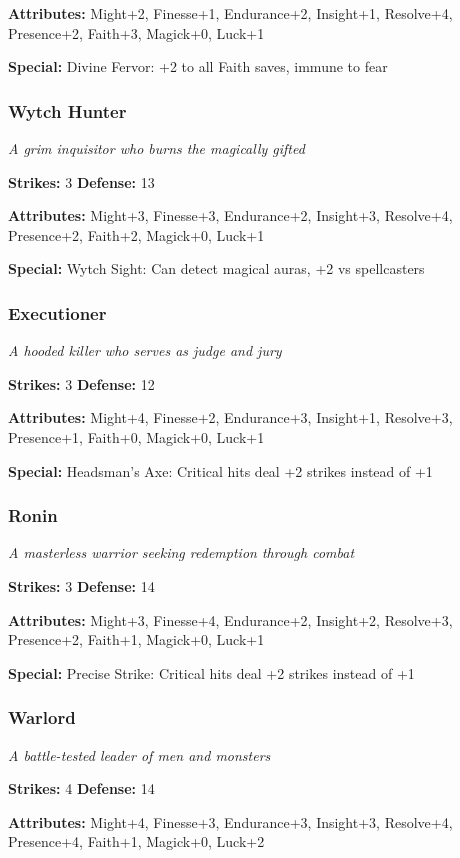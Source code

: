 \documentclass[10pt,twoside]{article}
\begin{document}
\textbf{Attributes:} Might+2, Finesse+1, Endurance+2, Insight+1, Resolve+4, Presence+2, Faith+3, Magick+0, Luck+1

\textbf{Special:} Divine Fervor: +2 to all Faith saves, immune to fear

\subsubsection{Wytch Hunter}
\textit{A grim inquisitor who burns the magically gifted}

\textbf{Strikes:} 3 \quad \textbf{Defense:} 13

\textbf{Attributes:} Might+3, Finesse+3, Endurance+2, Insight+3, Resolve+4, Presence+2, Faith+2, Magick+0, Luck+1

\textbf{Special:} Wytch Sight: Can detect magical auras, +2 vs spellcasters

\subsubsection{Executioner}
\textit{A hooded killer who serves as judge and jury}

\textbf{Strikes:} 3 \quad \textbf{Defense:} 12

\textbf{Attributes:} Might+4, Finesse+2, Endurance+3, Insight+1, Resolve+3, Presence+1, Faith+0, Magick+0, Luck+1

\textbf{Special:} Headsman's Axe: Critical hits deal +2 strikes instead of +1

\subsubsection{Ronin}
\textit{A masterless warrior seeking redemption through combat}

\textbf{Strikes:} 3 \quad \textbf{Defense:} 14

\textbf{Attributes:} Might+3, Finesse+4, Endurance+2, Insight+2, Resolve+3, Presence+2, Faith+1, Magick+0, Luck+1

\textbf{Special:} Precise Strike: Critical hits deal +2 strikes instead of +1

\subsubsection{Warlord}
\textit{A battle-tested leader of men and monsters}

\textbf{Strikes:} 4 \quad \textbf{Defense:} 14

\textbf{Attributes:} Might+4, Finesse+3, Endurance+3, Insight+3, Resolve+4, Presence+4, Faith+1, Magick+0, Luck+2
\end{document}
